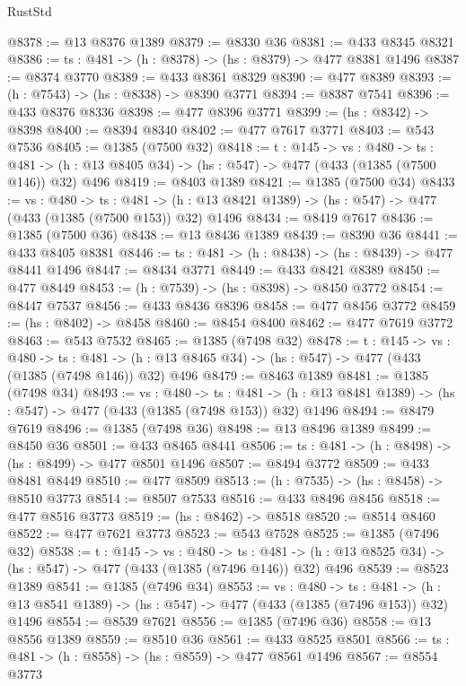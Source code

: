 \begin{lexlean}{RustStd}
\begin{coremodule}
@8378 := @13 @8376 @1389
@8379 := @8330 @36
@8381 := @433 @8345 @8321
@8386 := {ts : @481} -> (h : @8378) -> (hs : @8379) -> @477 @8381 @1496
@8387 := @8374 @3770
@8389 := @433 @8361 @8329
@8390 := @477 @8389
@8393 := (h : @7543) -> (hs : @8338) -> @8390 @3771
@8394 := @8387 @7541
@8396 := @433 @8376 @8336
@8398 := @477 @8396 @3771
@8399 := (hs : @8342) -> @8398
@8400 := @8394 @8340
@8402 := @477 @7617 @3771
@8403 := @543 @7536
@8405 := @1385 (@7500 @32)
@8418 := {t : @145} ->
  {vs : @480} ->
  {ts : @481} -> (h : @13 @8405 @34) -> (hs : @547) -> @477 (@433 (@1385 (@7500 @146)) @32) @496
@8419 := @8403 @1389
@8421 := @1385 (@7500 @34)
@8433 := {vs : @480} ->
  {ts : @481} -> (h : @13 @8421 @1389) -> (hs : @547) -> @477 (@433 (@1385 (@7500 @153)) @32) @1496
@8434 := @8419 @7617
@8436 := @1385 (@7500 @36)
@8438 := @13 @8436 @1389
@8439 := @8390 @36
@8441 := @433 @8405 @8381
@8446 := {ts : @481} -> (h : @8438) -> (hs : @8439) -> @477 @8441 @1496
@8447 := @8434 @3771
@8449 := @433 @8421 @8389
@8450 := @477 @8449
@8453 := (h : @7539) -> (hs : @8398) -> @8450 @3772
@8454 := @8447 @7537
@8456 := @433 @8436 @8396
@8458 := @477 @8456 @3772
@8459 := (hs : @8402) -> @8458
@8460 := @8454 @8400
@8462 := @477 @7619 @3772
@8463 := @543 @7532
@8465 := @1385 (@7498 @32)
@8478 := {t : @145} ->
  {vs : @480} ->
  {ts : @481} -> (h : @13 @8465 @34) -> (hs : @547) -> @477 (@433 (@1385 (@7498 @146)) @32) @496
@8479 := @8463 @1389
@8481 := @1385 (@7498 @34)
@8493 := {vs : @480} ->
  {ts : @481} -> (h : @13 @8481 @1389) -> (hs : @547) -> @477 (@433 (@1385 (@7498 @153)) @32) @1496
@8494 := @8479 @7619
@8496 := @1385 (@7498 @36)
@8498 := @13 @8496 @1389
@8499 := @8450 @36
@8501 := @433 @8465 @8441
@8506 := {ts : @481} -> (h : @8498) -> (hs : @8499) -> @477 @8501 @1496
@8507 := @8494 @3772
@8509 := @433 @8481 @8449
@8510 := @477 @8509
@8513 := (h : @7535) -> (hs : @8458) -> @8510 @3773
@8514 := @8507 @7533
@8516 := @433 @8496 @8456
@8518 := @477 @8516 @3773
@8519 := (hs : @8462) -> @8518
@8520 := @8514 @8460
@8522 := @477 @7621 @3773
@8523 := @543 @7528
@8525 := @1385 (@7496 @32)
@8538 := {t : @145} ->
  {vs : @480} ->
  {ts : @481} -> (h : @13 @8525 @34) -> (hs : @547) -> @477 (@433 (@1385 (@7496 @146)) @32) @496
@8539 := @8523 @1389
@8541 := @1385 (@7496 @34)
@8553 := {vs : @480} ->
  {ts : @481} -> (h : @13 @8541 @1389) -> (hs : @547) -> @477 (@433 (@1385 (@7496 @153)) @32) @1496
@8554 := @8539 @7621
@8556 := @1385 (@7496 @36)
@8558 := @13 @8556 @1389
@8559 := @8510 @36
@8561 := @433 @8525 @8501
@8566 := {ts : @481} -> (h : @8558) -> (hs : @8559) -> @477 @8561 @1496
@8567 := @8554 @3773

\end{coremodule}
\end{lexlean}
